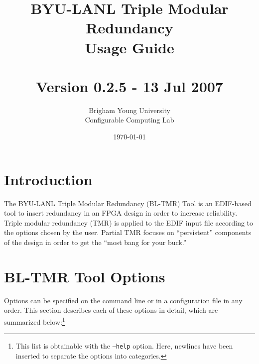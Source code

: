 \documentclass[english]{article}
\title{BYU-LANL Triple Modular Redundancy \\ Usage Guide \\ ~ \\
  Version 0.2.5 - 13 Jul 2007}
\author{Brigham Young University \\ Configurable Computing Lab}
\date{\today}
\begin{document}
\maketitle

\newpage
\tableofcontents
\newpage

\section{Introduction}
The BYU-LANL Triple Modular Redundancy (BL-TMR) Tool is an EDIF-based tool to 
insert redundancy in an FPGA design in order to increase reliability. Triple 
modular redundancy (TMR) is applied to the EDIF input file according to the 
options chosen by the user. Partial TMR focuses on ``persistent'' components of 
the design in order to get the ``most bang for your buck.''

\section{BL-TMR Tool Options}
Options can be specified on the command line or in a configuration file in any 
order. This section describes each of these options in detail, which are 
summarized below:\footnote{This list is obtainable with the \texttt{--help} 
option. Here, newlines have been inserted to separate the options into 
categories.}
\end{document}
